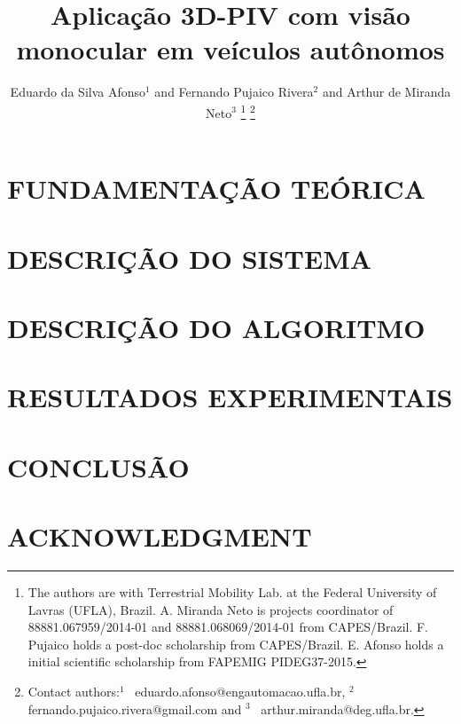 \documentclass[letterpaper, 10 pt,conference]{ieeeconf}  %
\title{\LARGE \bf
Aplicação 3D-PIV com visão monocular em veículos autônomos
}
\author{Eduardo da Silva Afonso$^{1}$ and Fernando Pujaico Rivera$^{2}$ and Arthur de Miranda Neto$^{3}$%
\thanks{The authors are with Terrestrial Mobility Lab. at the Federal University of Lavras (UFLA), Brazil. 
A. Miranda Neto is projects coordinator
of 88881.067959/2014-01 and 88881.068069/2014-01 from CAPES/Brazil. 
F. Pujaico holds a post-doc scholarship from CAPES/Brazil. 
E. Afonso holds a initial scientific scholarship from FAPEMIG PIDEG37-2015.}%
\thanks{Contact authors:$^{1}$~ eduardo.afonso@engautomacao.ufla.br,  $^{2}$~ fernando.pujaico.rivera@gmail.com and
$^{3}$~ arthur.miranda@deg.ufla.br.}%
}
\begin{document}
\maketitle
\thispagestyle{empty}
\pagestyle{empty}

\begin{abstract}



\end{abstract}



\section{FUNDAMENTAÇÃO TEÓRICA}




\section{DESCRIÇÃO DO SISTEMA}


\section{DESCRIÇÃO DO ALGORITMO}
 





\section{RESULTADOS EXPERIMENTAIS}





\section{CONCLUSÃO}


\section*{ACKNOWLEDGMENT}



\end{document}
